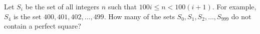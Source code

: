 Let $ S_i$ be the set of all integers $ n$ such that $ 100i\leq n < 100(i + 1)$.  For example, $ S_4$ is the set $ {400,401,402,\ldots,499}$.  How many of the sets $ S_0, S_1, S_2, \ldots, S_{999}$ do not contain a perfect square?